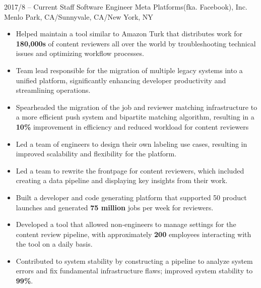 \documentclass[9pt]{developercv} %
\begin{document}
\vspace{0.5cm}






\begin{entrylist}
	\entry
		{2017/8 -- Current}
		{Staff Software Engineer}
		{Meta Platforms(fka. Facebook), Inc.\\\footnotesize{Menlo Park, CA/Sunnyvale, CA/New York, NY}} 
		{
			\begin{itemize}[leftmargin=-0.0125in]
				\item Helped maintain a tool similar to Amazon Turk that distributes work for \textbf{180,000s} of content reviewers all over the world by troubleshooting technical issues and optimizing workflow processes.
				\item Team lead responsible for the migration of multiple legacy systems into a unified platform, significantly enhancing developer productivity and streamlining operations.
				\item Spearheaded the migration of the job and reviewer matching infrastructure to a more efficient push system and bipartite matching algorithm, resulting in a \textbf{10\%} improvement in efficiency and reduced workload for content reviewers
				\item Led a team of engineers to design their own labeling use cases, resulting in improved scalability and flexibility for the platform.
				\item Led a team to rewrite the frontpage for content reviewers, which included creating a data pipeline and displaying key insights from their work.
				\item Built a developer and code generating platform that supported 50 product launches and generated \textbf{75 million} jobs per week for reviewers. 
				\item Developed a tool that allowed non-engineers to manage settings for the content review pipeline, with approximately \textbf{200} employees interacting with the tool on a daily basis.
				\item Contributed to system stability by constructing a pipeline to analyze system errors and fix fundamental infrastructure flaws; improved system stability to \textbf{99\%}.

\end{itemize}}
\end{entrylist}
\end{document}
